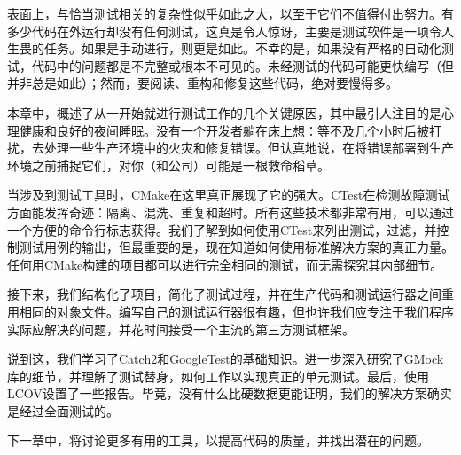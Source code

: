 表面上，与恰当测试相关的复杂性似乎如此之大，以至于它们不值得付出努力。有多少代码在外运行却没有任何测试，这真是令人惊讶，主要是测试软件是一项令人生畏的任务。如果是手动进行，则更是如此。不幸的是，如果没有严格的自动化测试，代码中的问题都是不完整或根本不可见的。未经测试的代码可能更快编写（但并非总是如此）；然而，要阅读、重构和修复这些代码，绝对要慢得多。

本章中，概述了从一开始就进行测试工作的几个关键原因，其中最引人注目的是心理健康和良好的夜间睡眠。没有一个开发者躺在床上想：等不及几个小时后被打扰，去处理一些生产环境中的火灾和修复错误。但认真地说，在将错误部署到生产环境之前捕捉它们，对你（和公司）可能是一根救命稻草。

当涉及到测试工具时，CMake在这里真正展现了它的强大。CTest在检测故障测试方面能发挥奇迹：隔离、混洗、重复和超时。所有这些技术都非常有用，可以通过一个方便的命令行标志获得。我们了解到如何使用CTest来列出测试，过滤，并控制测试用例的输出，但最重要的是，现在知道如何使用标准解决方案的真正力量。任何用CMake构建的项目都可以进行完全相同的测试，而无需探究其内部细节。

接下来，我们结构化了项目，简化了测试过程，并在生产代码和测试运行器之间重用相同的对象文件。编写自己的测试运行器很有趣，但也许我们应专注于我们程序实际应解决的问题，并花时间接受一个主流的第三方测试框架。

说到这，我们学习了Catch2和GoogleTest的基础知识。进一步深入研究了GMock库的细节，并理解了测试替身，如何工作以实现真正的单元测试。最后，使用LCOV设置了一些报告。毕竟，没有什么比硬数据更能证明，我们的解决方案确实是经过全面测试的。

下一章中，将讨论更多有用的工具，以提高代码的质量，并找出潜在的问题。